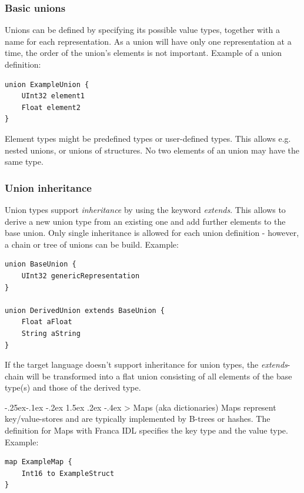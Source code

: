 \documentclass[a4paper,10pt]{scrreprt}
\makeatletter
\renewcommand\subsection{\medskip\@startsection{subsection}{2}{\z@}%
  {-.25ex\@plus -.1ex \@minus -.2ex}%
  {1.5ex \@plus .2ex \@minus -.4ex}%
  {\ifnum \scr@compatibility>\@nameuse{scr@v@2.96}\relax
    \setlength{\parfillskip}{\z@ plus 1fil}\fi
    \raggedsection\normalfont\sectfont\nobreak\size@subsection
  }%
}
\makeatother
\begin{document}
\subsubsection{Basic unions}
\label{FIDL_Types_Union_Basic}
Unions can be defined by specifying its possible value types, together with a name for
each representation. As a union will have only one representation at a time, the order of
the union's elements is not important. Example of a union definition: 

\begin{lstlisting}[language=Franca]
union ExampleUnion {
	UInt32 element1
	Float element2
}
\end{lstlisting}

Element types might be predefined types or user-defined types.
This allows e.g. nested unions, or unions of structures.
No two elements of an union may have the same type. 

\subsubsection{Union inheritance}
\label{FIDL_Types_Union_Inheritance}
Union types support \textit{inheritance} by using the keyword \textit{extends}.
This allows to derive a new union type from an existing one and add
further elements to the base union. Only single inheritance is allowed for
each union definition - however, a chain or tree of unions can be build. Example:

\begin{lstlisting}[language=Franca]
union BaseUnion {
	UInt32 genericRepresentation
}

union DerivedUnion extends BaseUnion {
	Float aFloat
	String aString
}
\end{lstlisting}

If the target language doesn't support inheritance for union types, the \textit{extends}-chain
will be transformed into a flat union consisting of all elements of the base
type(s) and those of the derived type.

\subsection{Maps (aka dictionaries)}
\label{FIDL_Types_Map}
Maps represent key/value-stores and are typically implemented by B-trees or hashes.
The definition for Maps with Franca IDL specifies the key type and the value type.
Example:

\begin{lstlisting}[language=Franca]
map ExampleMap {
	Int16 to ExampleStruct
}
\end{lstlisting}
\end{document}
